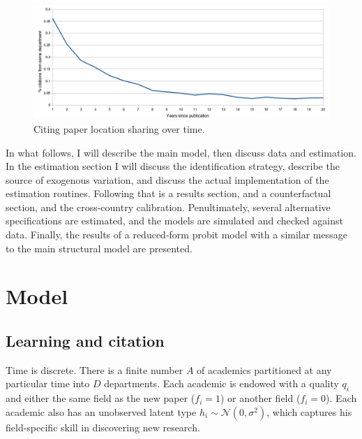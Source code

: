 \begin{figure}[h!]
    \centering
    \includegraphics{pics/raw_diffusion.png}
    \caption{Citing paper location sharing over time.}
    \label{fig:rawdiffusion}
\end{figure}

In what follows, I will describe the main model, then discuss data and
estimation. In the estimation section I will discuss the identification
strategy, describe the source of exogenous variation, and discuss the
actual implementation of the estimation routines. Following that is a
results section, and a counterfactual section, and the cross-country calibration.
Penultimately, several alternative
specifications are estimated, and the models are simulated and checked
against data.  Finally, the results of a reduced-form probit model with a similar 
message to the main structural model are presented.

\section{Model}
\label{sec:model}

\subsection{Learning and citation}
\label{sec:learncit}

Time is discrete. There is a finite number $A$ of academics partitioned
at any particular time into $D$ departments. Each academic is endowed with a quality
$q_i$ and either the same field as the new paper ($f_i = 1$) or another
field ($f_i = 0$). Each academic also has an unobserved latent type
$h_i \sim \mathcal{N}(0,\sigma^2)$, which captures his field-specific
skill in discovering new research.

